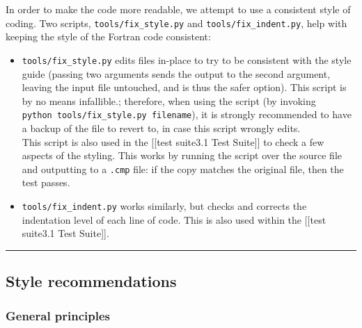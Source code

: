 In order to make the code more readable, we attempt to use a consistent
style of coding. Two scripts, \texttt{tools/fix\_style.py} and
\texttt{tools/fix\_indent.py}, help with keeping the style of the
Fortran code consistent:

\begin{itemize}
\item
  \texttt{tools/fix\_style.py} edits files in-place to try to be
  consistent with the style guide (passing two arguments sends the
  output to the second argument, leaving the input file untouched, and
  is thus the safer option). This script is by no means infallible.;
  therefore, when using the script (by invoking
  \texttt{python\ tools/fix\_style.py\ filename}), it is strongly
  recommended to have a backup of the file to revert to, in case this
  script wrongly edits.\\
  This script is also used in the {[}{[}test suite\textbar{}3.1 Test
  Suite{]}{]} to check a few aspects of the styling. This works by
  running the script over the source file and outputting to a
  \texttt{.cmp} file: if the copy matches the original file, then the
  test passes.
\item
  \texttt{tools/fix\_indent.py} works similarly, but checks and corrects
  the indentation level of each line of code. This is also used within
  the {[}{[}test suite\textbar{}3.1 Test Suite{]}{]}.
\end{itemize}

\begin{center}\rule{0.5\linewidth}{\linethickness}\end{center}

\hypertarget{style-recommendations}{%
\subsection{Style recommendations}\label{style-recommendations}}

\hypertarget{general-principles}{%
\subsubsection{General principles}\label{general-principles}}

